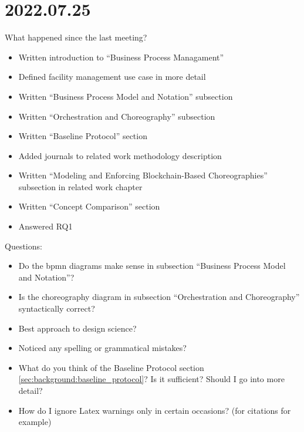 \section{2022.07.25}
What happened since the last meeting?
\begin{itemize}
    \item Written introduction to ``Business Process Managament''
    \item Defined facility management use case in more detail
    \item Written ``Business Process Model and Notation'' subsection
    \item Written ``Orchestration and Choreography'' subsection
    \item Written ``Baseline Protocol'' section
    \item Added journals to related work methodology description
    \item Written ``Modeling and Enforcing Blockchain-Based Choreographies'' subsection in related work chapter
    \item Written ``Concept Comparison'' section
    \item Answered RQ1
\end{itemize}

Questions:
\begin{itemize}
    \item Do the \gls{bpmn} diagrams make sense in subsection ``Business Process Model and Notation''?
    \item Is the choreography diagram in subsection ``Orchestration and Choreography'' syntactically correct?
    \item Best approach to design science?
    \item Noticed any spelling or grammatical mistakes?
    \item What do you think of the Baseline Protocol section \ref{sec:background:baseline_protocol}? Is it sufficient? Should I go into more detail?
    \item How do I ignore Latex warnings only in certain occasions? (for citations for example)
\end{itemize}

